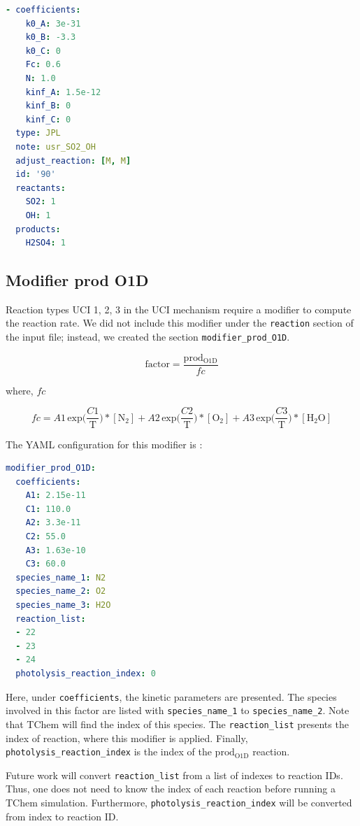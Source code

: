 \documentclass[report, 12pt]{SANDreport}
\begin{document}
\begin{lstlisting}[language=yaml]
- coefficients:
    k0_A: 3e-31
    k0_B: -3.3
    k0_C: 0
    Fc: 0.6
    N: 1.0
    kinf_A: 1.5e-12
    kinf_B: 0
    kinf_C: 0
  type: JPL
  note: usr_SO2_OH
  adjust_reaction: [M, M]
  id: '90'
  reactants:
    SO2: 1
    OH: 1
  products:
    H2SO4: 1
\end{lstlisting}

\subsection{Modifier prod O1D}

Reaction types UCI 1, 2, 3
in the UCI mechanism require a modifier to compute the reaction rate. We did not include this modifier under the \verb|reaction| section of the input file; instead, we created the section \verb|modifier_prod_O1D|.

\begin{equation}
\mathrm{factor} = \frac{\mathrm{prod_{O1D}}}{fc}
\end{equation}

where, $fc$

\begin{equation}
fc = A1\, \mathrm{exp} \Big(\frac{C1}{\mathrm{T}} \Big) * [\mathrm{N_2}] +
A2\, \mathrm{exp} \Big(\frac{C2}{\mathrm{T}} \Big) * [\mathrm{O_2}] +
A3\, \mathrm{exp} \Big(\frac{C3}{\mathrm{T}} \Big) * [\mathrm{H_2O}]
\end{equation}

The YAML configuration for this modifier is :

\begin{lstlisting}[language=yaml]
modifier_prod_O1D:
  coefficients:
    A1: 2.15e-11
    C1: 110.0
    A2: 3.3e-11
    C2: 55.0
    A3: 1.63e-10
    C3: 60.0
  species_name_1: N2
  species_name_2: O2
  species_name_3: H2O
  reaction_list:
  - 22
  - 23
  - 24
  photolysis_reaction_index: 0
\end{lstlisting}
Here, under \verb|coefficients|, the kinetic parameters are presented. The species involved in this factor are listed with \verb|species_name_1| to \verb|species_name_2|. Note that TChem will find the index of this species. The \verb|reaction_list| presents the index of reaction, where this modifier is applied. Finally, \verb|photolysis_reaction_index| is the index of the $\mathrm{prod_{O1D}}$ reaction.

Future work will convert \verb|reaction_list| from a list of indexes to reaction IDs. Thus, one does not need to know the index of each reaction before running a TChem simulation. Furthermore, \verb|photolysis_reaction_index| will be converted from index to reaction ID.
\end{document}
